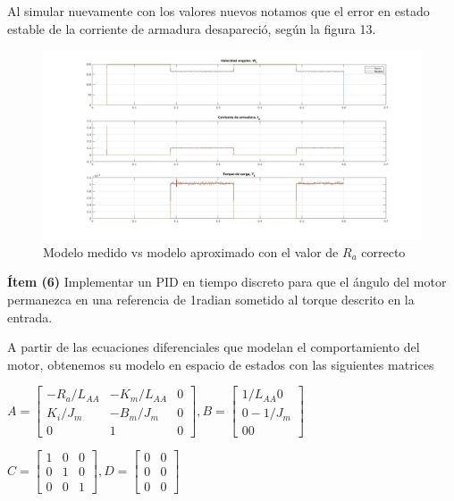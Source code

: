 \documentclass{article}
\begin{document}
Al simular nuevamente con los valores nuevos notamos que el error en estado estable de la corriente de armadura desapareció, según
la figura 13.

\begin{figure}[!h]
  \centering
  \includegraphics[width=1\textwidth]{img/mot5-5.jpg}
  \caption{Modelo medido vs modelo aproximado con el valor de $R_a$ correcto}
\end{figure}

\textbf{Ítem (6)} Implementar un PID en tiempo discreto para que el ángulo del motor permanezca en una
referencia de 1radian sometido al torque descrito en la entrada.

A partir de las ecuaciones diferenciales que modelan el comportamiento del motor, obtenemos su modelo en espacio
de estados con las siguientes matrices

\begin{center}
\begin{math}
  A = 
  \begin{bmatrix}
    -R_a/L_{AA} & -K_m/L_{AA} & 0 \\
    K_i/J_m & -B_m/J_m & 0 \\
    0 & 1 & 0
  \end{bmatrix} 
  , B =
  \begin{bmatrix}
    1/L_{AA} 0 \\
    0 -1/J_m \\
    0 0
  \end{bmatrix} 
\end{math}

\begin{math}
  C = 
  \begin{bmatrix}
    1 & 0 & 0\\
    0 & 1 & 0\\
    0 & 0 & 1
  \end{bmatrix} 
  , D = 
  \begin{bmatrix}
    0 & 0\\
    0 & 0\\
    0 & 0
  \end{bmatrix} 
\end{math}
\end{center}
\end{document}
